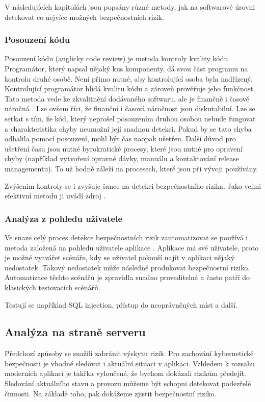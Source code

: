 \documentclass[thesis=M,czech]{FITthesis}[2012/10/20]
\begin{document}
			V následujících kapitolách jsou popsány různé metody, jak na softwarové úrovni detekovat co nejvíce možných bezpečnostních rizik.
			
			\subsubsection{Posouzení kódu}
				Posouzení kódu (anglicky code review) je metoda kontroly kvality kódu. Programátor, který napsal nějaký kus komponenty, dá svou část programu na kontrolu druhé osobě. Není přímo nutné, aby kontrolující osoba byla nadřízený. Kontrolující programátor hlídá kvalitu kódu a zároveň prověřuje jeho funkčnost. Tato metoda vede ke zkvalitnění dodávaného softwaru, ale je finančně i časově náročná \cite{code-rew}. Lze ovšem říci, že finanční i časová náročnost jsou diskutabilní. Lze se setkat s tím, že kód, který neprošel posouzením druhou osobou nebude fungovat a charakteristika chyby neumožní její snadnou detekci. Pokud by se tato chyba odhalila pomocí posouzení, mohl být čas naopak ušetřen. Další důvod pro ušetření času jsou nutné byrokratické procesy, které jsou nutné pro opravení chyby (například vytvoření opravné dávky, manuálu a kontaktování release managementu). To už hodně záleží na procesech, které jsou při vývoji používány. 
			
			Zvýšením kontroly se i zvyšuje šance na detekci bezpečnostního rizika. Jako velmi efektivní metodu ji uvádí zdroj \cite{pethukovKozlovVulnerabilities}.
			
			\subsubsection{Analýza z pohledu uživatele}
				Ve snaze celý proces detekce bezpečnostních rizik zautomatizovat se používá i metoda založená na pohledu uživatele aplikace \cite{pethukovKozlovVulnerabilities}. Aplikace má své uživatele, proto je možné vytvářet scénáře, kdy se uživatel pokouší najít v aplikaci nějaký nedostatek. Takový nedostatek může následně produkovat bezpečnostní riziko. Automatizace těchto scénářů je zpravidla snadno proveditelná a často patří do klasických testovacích scénářů.
				
				Testují se například SQL injection, přístup do neoprávněných míst a další.
				
			\subsection{Analýza na straně serveru}
				Předchozí způsoby se snažili zabránit výskytu rizik. Pro zachování kybernetické bezpečnosti je vhodné sledovat i aktuální situaci v aplikaci. Vzhledem k rozsahu moderních aplikací je takřka vyloučené, že bychom dokázali rizikům předejít. Sledování aktuálního stavu a provozu můžeme být schopni detekovat podezřelé činnosti. Na základě toho, pak dokážeme zjistit bezpečnostní riziko.
				
\end{document}
